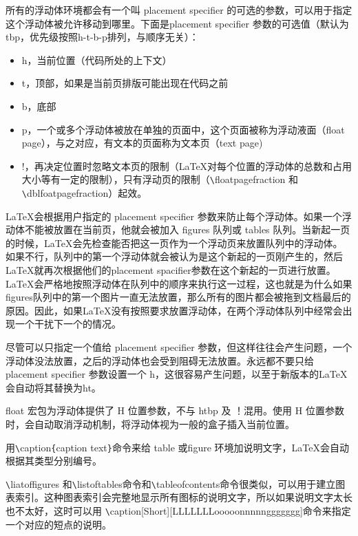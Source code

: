 \documentclass[UTF8]{ctexart}
\begin{document}
\qquad 所有的浮动体环境都会有一个叫 placement specifier 的可选的参数，可以用于指定这个浮动体被允许移动到哪里。下面是placement specifier 参数的可选值（默认为tbp，优先级按照h-t-b-p排列，与顺序无关）：
\begin{itemize}
  \item h，当前位置（代码所处的上下文）
  \item t，顶部，如果是当前页排版可能出现在代码之前
  \item b，底部
  \item p，一个或多个浮动体被放在单独的页面中，这个页面被称为浮动液面（float page），与之对应，有文本的页面称为文本页（text page)
  \item !，再决定位置时忽略文本页的限制（\LaTeX 对每个位置的浮动体的总数和占用大小等有一定的限制），只有浮动页的限制（\texttt{\textbackslash}floatpagefraction 和\texttt{\textbackslash}dblfoatpagefraction）起效。
\end{itemize}
\qquad \LaTeX 会根据用户指定的 placement specifier 参数来防止每个浮动体。如果一个浮动体不能被放置在当前页，他就会被加入 figures 队列或 tables 队列。当新起一页的时候，\LaTeX 会先检查能否把这一页作为一个浮动页来放置队列中的浮动体。
如果不行，队列中的第一个浮动体就会被认为是这个新起的一页刚产生的，然后\LaTeX 就再次根据他们的placement spacifier参数在这个新起的一页进行放置。
\LaTeX 会严格地按照浮动体在队列中的顺序来执行这一过程，这也就是为什么如果figures队列中的第一个图片一直无法放置，那么所有的图片都会被拖到文档最后的原因。因此，如果\LaTeX 没有按照要求放置浮动体，在两个浮动体队列中经常会出现一个干扰下一个的情况。

\qquad 尽管可以只指定一个值给 placement specifier 参数，但这样往往会产生问题，一个浮动体没法放置，之后的浮动体也会受到阻碍无法放置。永远都不要只给 placement specifier 参数设置一个 h，这很容易产生问题，以至于新版本的\LaTeX 会自动将其替换为ht。

\qquad float 宏包为浮动体提供了 H 位置参数，不与 htbp 及 ！混用。使用 H 位置参数时，会自动取消浮动机制，将浮动体视为一般的盒子插入当前位置。

\qquad 用\texttt{\textbackslash}caption\texttt{\{}caption text\texttt{\}}命令来给 table 或figure 环境加说明文字，\LaTeX 会自动根据其类型分别编号。

\qquad \texttt{\textbackslash}liatoffigures 和\texttt{\textbackslash}listoftables命令和\texttt{\textbackslash}tableofcontents命令很类似，可以用于建立图表索引。这种图表索引会完整地显示所有图标的说明文字，所以如果说明文字太长也不太好，这时可以用
\texttt{\textbackslash}caption[Short][LLLLLLLooooonnnnnggggggg]命令来指定一个对应的短点的说明。
\end{document}
